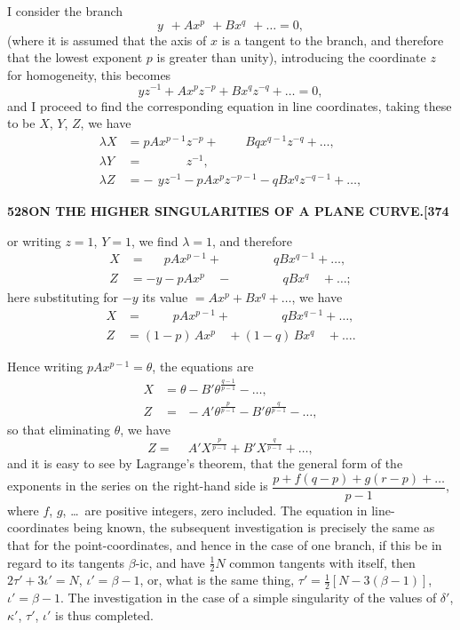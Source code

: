 \documentclass[11pt,a4paper]{article}
\begin{document}
I consider the branch
\[
y\phantom{^{p}} + Ax^{p}\phantom{^{q}} + Bx^{q}\phantom{^{r}} + \ldots = 0,
\]
(where it is assumed that the axis of $x$ is a tangent to the branch, and therefore that the lowest exponent $p$ is greater than unity), introducing the coordinate $z$ for homogeneity, this becomes
\[
yz^{-1} + Ax^{p}z^{-p} + Bx^{q}z^{-q} + \ldots = 0,
\]
and I proceed to find the corresponding equation in line coordinates, taking these to be $X$, $Y$, $Z$, we have
\begin{align*}
\lambda X &= pAx^{p-1}z^{-p} + \phantom{(1-}Bqx^{q-1}z^{-q} + \ldots,\\
\lambda Y &= \phantom{pAx^{p-1}}z^{-1},\\
\lambda Z &= -\phantom{(}yz^{-1} - pAx^{p}z^{-p-1} - qBx^{q}z^{-q-1} + \ldots,
\end{align*}

\newpage
\noindent\textbf{528\hspace{1em}ON THE HIGHER SINGULARITIES OF A PLANE CURVE.\hfill[374}

\vspace{12pt}

\noindent
or writing $z = 1$, $Y = 1$, we find $\lambda = 1$, and therefore
\begin{align*}
X &= \phantom{-y}\,pAx^{p-1} + \phantom{(1-p)}\,qBx^{q-1} + \ldots,\\
Z &= -y - pAx^{p}\phantom{^{-1}} - \phantom{(1-q)}\,qBx^{q}\phantom{^{-1}} + \ldots;
\end{align*}
here substituting for $-y$ its value $= Ax^{p} + Bx^{q} + \ldots$, we have
\begin{align*}
X &= \phantom{(1)}\,pAx^{p-1} + \phantom{(1-q)}\,qBx^{q-1} + \ldots,\\
Z &= (1 - p)\,Ax^{p}\phantom{^{-1}} + (1 - q)\,Bx^{q}\phantom{^{-1}} + \ldots.
\end{align*}

Hence writing $pAx^{p-1} = \theta$, the equations are
\begin{align*}
X &= \theta - B'\theta^{\frac{q-1}{p-1}} - \ldots,\\
Z &= \phantom{\theta} - A'\theta^{\frac{p}{p-1}} - B'\theta^{\frac{q}{p-1}} - \ldots,
\end{align*}
so that eliminating $\theta$, we have
\[
Z = \phantom{-}A'X^{\frac{p}{p-1}} + B'X^{\frac{q}{p-1}} + \ldots,
\]
and it is easy to see by Lagrange's theorem, that the general form of the exponents in the series on the right-hand side is $\dfrac{p + f(q - p) + g(r - p) + \ldots}{p - 1}$, where $f$, $g$, \ldots\ are positive integers, zero included. The equation in line-coordinates being known, the subsequent investigation is precisely the same as that for the point-coordinates, and hence in the case of one branch, if this be in regard to its tangents $\beta$-ic, and have $\tfrac{1}{2}N$ common tangents with itself, then $2\tau' + 3\iota' = N$, $\iota' = \beta - 1$, or, what is the same thing, $\tau' = \tfrac{1}{2}[N - 3(\beta - 1)]$, $\iota' = \beta - 1$. The investigation in the case of a simple singularity of the values of $\delta'$, $\kappa'$, $\tau'$, $\iota'$ is thus completed.
\end{document}
